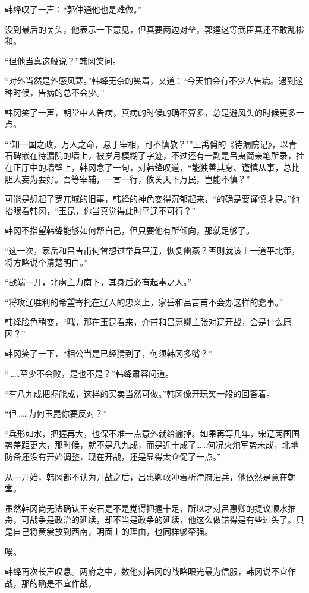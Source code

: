 韩绛叹了一声：“郭仲通他也是难做。”

没到最后的关头，他表示一下意见，但真要两边对垒，郭逵这等武臣真还不敢乱掺和。

“但他当真这般说？”韩冈笑问。

“对外当然是外感风寒。”韩绛无奈的笑着，又道：“今天怕会有不少人告病。遇到这种时候，告病的总不会少。”

韩冈笑了一声，朝堂中人告病，真病的时候的确不算多，总是避风头的时候更多一点。

“‘知一国之政，万人之命，悬于宰相，可不慎欤？’”王禹偁的《待漏院记》，以青石碑嵌在待漏院的墙上，被岁月模糊了字迹，不过还有一副是吕夷简亲笔所录，挂在正厅中的墙壁上，韩冈念了一句，对韩绛叹道，“能独善其身、谨慎从事，总比胆大妄为要好。吾等宰辅，一言一行，攸关天下万民，岂能不慎？”

可能是想起了罗兀城的旧事，韩绛的神色变得沉郁起来，“的确是要谨慎才是。”他抬眼看韩冈，“玉昆，你当真觉得此时平辽不可行？”

韩冈不指望韩绛能够如何帮自己，但只要他有所倾向，那就足够了。

“这一次，家岳和吕吉甫何曾想过举兵平辽，恢复幽燕？否则就该上一道平北策，将方略说个清楚明白。”

“战端一开，北虏主力南下，其身后必有起事之人。”

“将攻辽胜利的希望寄托在辽人的忠义上，家岳和吕吉甫不会办这样的蠢事。”

韩绛脸色稍变，“哦，那在玉昆看来，介甫和吕惠卿主张对辽开战，会是什么原因？”

韩冈笑了一下，“相公当是已经猜到了，何须韩冈多嘴？”

“……至少不会败，是也不是？”韩绛肃容问道。

“有八九成把握能成，这样的买卖当然可做。”韩冈像开玩笑一般的回答着。

“但……为何玉昆你要反对？”

“兵形如水，把握再大，也保不准一点意外就给输掉。如果再等几年，宋辽两国国势差距更大，那时候，就不是八九成，而是近十成了……何况火炮军势未成，北地防备还没有开始调整，现在开战，还是显得太仓促了一点。”

从一开始，韩冈都不认为开战之后，吕惠卿敢冲着析津府进兵，他依然是意在朝堂。

虽然韩冈尚无法确认王安石是不是觉得把握十足，所以才对吕惠卿的提议顺水推舟，可战争是政治的延续，却不当是政争的延续，他这么做错得是有些过头了。只是自己将黄裳放到西南，明面上的理由，也同样够牵强。

唉。

韩绛再次长声叹息。两府之中，数他对韩冈的战略眼光最为信服，韩冈说不宜作战，那的确是不宜作战。

